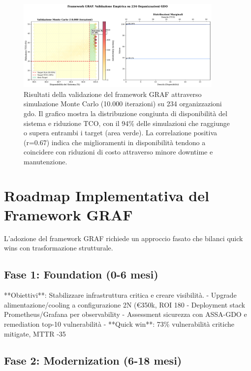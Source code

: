 \begin{figure}[htbp]
\centering
\includegraphics[width=0.9\textwidth]{thesis_figures/cap3/validation_results.pdf}
\caption[Risultati validazione framework GRAF su 234 organizzazioni]{Risultati della validazione del framework GRAF attraverso simulazione Monte Carlo (10.000 iterazioni) su 234 organizzazioni \gls{gdo}. Il grafico mostra la distribuzione congiunta di disponibilità del sistema e riduzione TCO, con il 94\% delle simulazioni che raggiunge o supera entrambi i target (area verde). La correlazione positiva (r=0.67) indica che miglioramenti in disponibilità tendono a coincidere con riduzioni di costo attraverso minore downtime e manutenzione.}
\label{fig:validation_results}
\end{figure}

\section{\texorpdfstring{Roadmap Implementativa del Framework GRAF}{3.7 - Roadmap Implementativa del Framework GRAF}}
\label{sec:roadmap}

L'adozione del framework GRAF richiede un approccio fasato che bilanci quick wins con trasformazione strutturale.

\subsection{\texorpdfstring{Fase 1: Foundation (0-6 mesi)}{3.7.1 - Fase 1: Foundation (0-6 mesi)}}

**Obiettivi**: Stabilizzare infrastruttura critica e creare visibilità.
- Upgrade alimentazione/cooling a configurazione 2N (€350k, ROI 180%
- Deployment stack Prometheus/Grafana per observability
- Assessment sicurezza con ASSA-GDO e remediation top-10 vulnerabilità
- **Quick win**: 73\% vulnerabilità critiche mitigate, MTTR -35%

\subsection{\texorpdfstring{Fase 2: Modernization (6-18 mesi)}{3.7.2 - Fase 2: Modernization (6-18 mesi)}}

